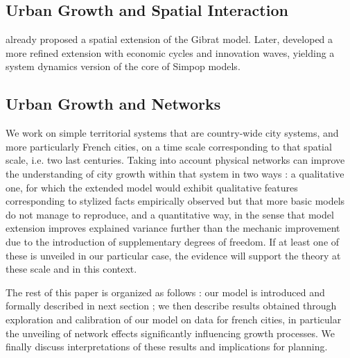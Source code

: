 \documentclass[Royal,sageh,times]{sagej}
\begin{document}


\subsection{Urban Growth and Spatial Interaction}



\cite{bretagnolle2000long} already proposed a spatial extension of the Gibrat model. Later, \cite{favaro2011gibrat} developed a more refined extension with economic cycles and innovation waves, yielding a system dynamics version of the core of Simpop models.



\subsection{Urban Growth and Networks}







We work on simple territorial systems that are country-wide city systems, and more particularly French cities, on a time scale corresponding to that spatial scale, i.e. two last centuries. Taking into account physical networks can improve the understanding of city growth within that system in two ways : a qualitative one, for which the extended model would exhibit qualitative features corresponding to stylized facts empirically observed but that more basic models do not manage to reproduce, and a quantitative way, in the sense that model extension improves explained variance further than the mechanic improvement due to the introduction of supplementary degrees of freedom. If at least one of these is unveiled in our particular case, the evidence will support the theory at these scale and in this context.



The rest of this paper is organized as follows : our model is introduced and formally described in next section ; we then describe results obtained through exploration and calibration of our model on data for french cities, in particular the unveiling of network effects significantly influencing growth processes. We finally discuss interpretations of these results and implications for planning.
\end{document}
